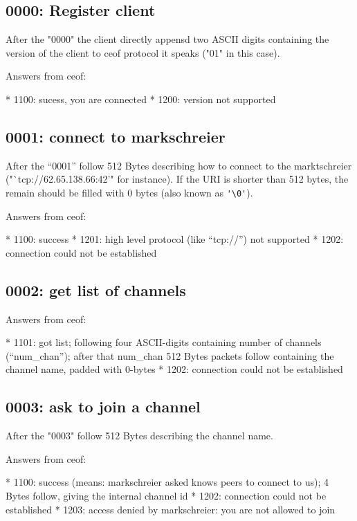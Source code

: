 \documentclass[12pt,a4paper]{article}
\begin{document}
\subsection{0000: Register client}

After the "0000" the client directly appensd two ASCII digits containing the version of the client to ceof protocol it speaks ("01" in this case).

Answers from ceof:

    * 1100: sucess, you are connected
    * 1200: version not supported


\subsection{0001: connect to markschreier}

After the "`0001"' follow 512 Bytes describing how to connect
to the marktschreier ("`tcp://62.65.138.66:42'" for instance).
If the URI is shorter than 512 bytes, the remain should be filled with 0 bytes
(also known as \verb='\0'=).

Answers from ceof:

    * 1100: success
    * 1201: high level protocol (like "`tcp://"') not supported
    * 1202: connection could not be established


\subsection{0002: get list of channels}

Answers from ceof:

    * 1101: got list; following four ASCII-digits containing number of channels
 ("`num\_chan"'); after that  num\_chan 512 Bytes packets follow containing the channel name, padded with 0-bytes
    * 1202: connection could not be established


\subsection{0003: ask to join a channel}

After the "0003" follow 512 Bytes describing the channel name.

Answers from ceof:

    * 1100: success (means: markschreier asked knows peers to connect to us); 4 Bytes follow, giving the internal channel id
    * 1202: connection could not be established
    * 1203: access denied by markschreier: you are not allowed to join
\end{document}
